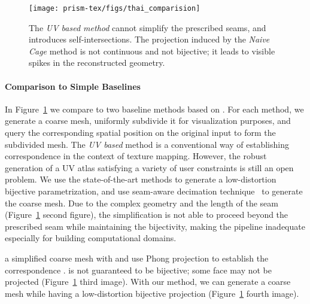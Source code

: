 \begin{figure}
    \centering
    \texttt{[image: prism-tex/figs/thai\_comparision]}
    \caption{The \emph{UV based method} cannot simplify the prescribed seams, and introduces self-intersections. 
    The projection induced by the \emph{Naive Cage} method is not continuous and not bijective; it leads to visible spikes in the reconstructed geometry.}
    \label{prism:fig:qslim_naive}
    
\end{figure}

\paragraph{Comparison to Simple Baselines}
In Figure~\ref{prism:fig:qslim_naive} we compare to two baseline methods based on \cite{garland1998simplifying}. For each method, we generate a coarse mesh, uniformly subdivide it for visualization purposes, 
and query the corresponding spatial position on the original input to form the subdivided mesh.
The \emph{UV based} method is a conventional way of establishing correspondence in the context of texture mapping. However, the robust generation of a UV atlas satisfying a variety of user constraints is still an open problem. We use the state-of-the-art methods \cite{li2018optcuts,jiang2017simplicial} to generate a low-distortion bijective parametrization, and use seam-aware decimation technique~\cite{liu2017seamless} to generate the coarse mesh.
Due to the complex geometry and the length of the seam (Figure~\ref{prism:fig:qslim_naive} second figure), the simplification is not able to proceed beyond the prescribed seam while maintaining the bijectivity, making the pipeline inadequate especially for building computational domains. 

 a simplified coarse mesh with \cite{garland1998simplifying} and use Phong projection to establish the correspondence \cite{kobbelt1998interactive,panozzo2013weighted}.  is not guaranteed to be bijective; some face may not be projected (Figure~\ref{prism:fig:qslim_naive} third image). With our method, we can generate a coarse mesh while having a low-distortion bijective projection (Figure~\ref{prism:fig:qslim_naive} fourth image).

